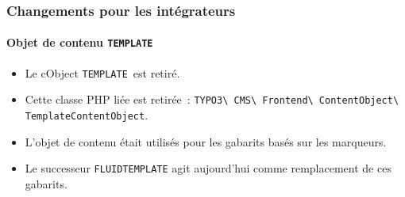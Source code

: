 %

\begin{frame}[fragile]
	\frametitle{Changements pour les intégrateurs}
	\framesubtitle{Objet de contenu \small\texttt{TEMPLATE}\normalsize}


	\begin{itemize}
		\item Le cObject \small\texttt{TEMPLATE}\normalsize~est retiré.
		\item Cette classe PHP liée est retirée~:\newline
			\smaller\texttt{TYPO3\textbackslash
				CMS\textbackslash
				Frontend\textbackslash
				ContentObject\textbackslash
				TemplateContentObject}.\normalsize
		\item L'objet de contenu était utilisés pour les gabarits basés sur les marqueurs.
		\item Le successeur
			\small\texttt{FLUIDTEMPLATE}\normalsize
			\tabto{4.8cm}agit aujourd'hui comme remplacement de ces gabarits.
	\end{itemize}
\end{frame}

